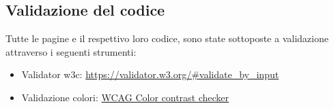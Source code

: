 \subsection{Validazione del codice}
Tutte le pagine e il respettivo loro codice, sono state sottoposte a validazione attraverso i seguenti strumenti:\begin{itemize}
\item Validator w3c: \url{https://validator.w3.org/#validate_by_input}
\item Validazione colori: \href{https://chrome.google.com/webstore/detail/wcag-color-contrast-
check/plnahcmalebffmaghcpcmpaciebdhgdf}{WCAG Color contrast checker}
\end{itemize}